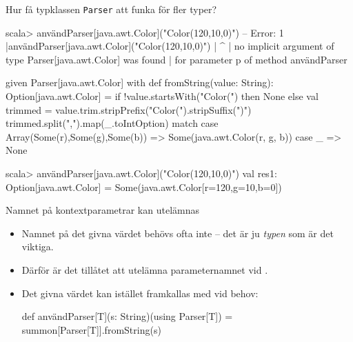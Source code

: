\begin{Slide}{Hur få typklassen \texttt{Parser} att funka för fler typer?}
\begin{REPLsmall}
scala> användParser[java.awt.Color]("Color(120,10,0)")
-- Error:
1 |användParser[java.awt.Color]("Color(120,10,0)")
  |                                        ^
  | no implicit argument of type Parser[java.awt.Color] was found 
  | for parameter p of method användParser
\end{REPLsmall}
\begin{Code}
given Parser[java.awt.Color] with
  def fromString(value: String): Option[java.awt.Color] =
    if !value.startsWith("Color(") then None else 
      val trimmed = value.trim.stripPrefix("Color(").stripSuffix(")")
      trimmed.split(",").map(_.toIntOption) match
        case Array(Some(r),Some(g),Some(b)) => Some(java.awt.Color(r, g, b))
        case _ => None
\end{Code}
\begin{REPLsmall}
scala> användParser[java.awt.Color]("Color(120,10,0)")
val res1: Option[java.awt.Color] = Some(java.awt.Color[r=120,g=10,b=0])
\end{REPLsmall}
\end{Slide}


\begin{Slide}{Namnet på kontextparametrar kan utelämnas}\SlideFontSmall
\begin{itemize}\SlideFontSmall
\item Namnet på det givna värdet behövs ofta inte -- det är ju \emph{typen} som är det viktiga.
\item Därför är det tillåtet att utelämna parameternamnet vid . 
\item Det givna värdet kan istället framkallas med  vid behov:%
\begin{Code}
def användParser[T](s: String)(using Parser[T]) = 
  summon[Parser[T]].fromString(s)
\end{Code}
\end{itemize}

\end{Slide}


